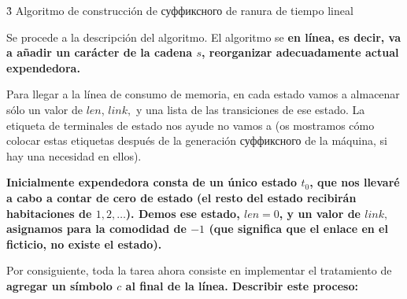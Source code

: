 \h3{ Algoritmo de construcción de суффиксного de ranura de tiempo lineal }

Se procede a la descripción del algoritmo. El algoritmo se \bf{en línea}, es decir, va a añadir un carácter de la cadena $s$, reorganizar adecuadamente actual expendedora.

Para llegar a la línea de consumo de memoria, en cada estado vamos a almacenar sólo un valor de $len$, $link,$ y una lista de las transiciones de ese estado. La etiqueta de terminales de estado nos ayude no vamos a (os mostramos cómo colocar estas etiquetas después de la generación суффиксного de la máquina, si hay una necesidad en ellos).

\bf{Inicialmente} expendedora consta de un único estado $t_0$, que nos llevaré a cabo a contar de cero de estado (el resto del estado recibirán habitaciones de $1, 2, \ldots$). Demos ese estado, $len = 0$, y un valor de $link,$ asignamos para la comodidad de $-1$ (que significa que el enlace en el ficticio, no existe el estado).

Por consiguiente, toda la tarea ahora consiste en implementar el tratamiento de \bf{agregar un símbolo} $c$ al final de la línea. Describir este proceso:

